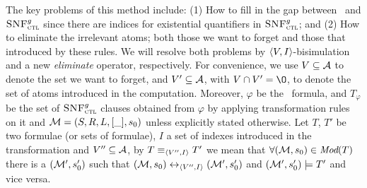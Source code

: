 \documentclass{article}
\begin{document}
The key problems of this method include: (1) How to fill in  the gap between \CTL\ and ${\textsc{SNF}_{\textsc{ctl}}^g}$ since there are indices for existential quantifiers in ${\textsc{SNF}_{\textsc{ctl}}^g}$; and (2) How to eliminate the irrelevant atoms; both those we want to forget and those that introduced by these rules.
We will resolve both problems by ${\langle{V,I}\rangle}$-bisimulation and a new \emph{eliminate} operator, respectively.
For convenience, we use $V\subseteq {\cal A}$ to denote the set we want to forget, and $V' \subseteq {\cal A}$, with $V \cap V'={\O}$,  to denote the set of atoms introduced in the computation.  Moreover, $\varphi$  be the \CTL\ formula, and $T_{\varphi}$ be the set of ${\textsc{SNF}_{\textsc{ctl}}^g}$ clauses obtained from $\varphi$ by applying transformation rules on it  and ${\cal M}=(S,R,L,[\_], s_0)$ unless explicitly stated otherwise.
 Let $T$, $T'$ be two formulae (or sets of formulae), $I$ a set of indexes introduced in the transformation and $V''\subseteq {\cal A}$, by $T\equiv_{{\langle{V'', I}\rangle}} T'$ we mean that $\forall ({\cal M}, s_0) \in \textit{Mod}(T)$ there is a $({\cal M}', s_0')$ such that $({\cal M},s_0) \leftrightarrow_{{\langle{V'', I}\rangle}} ({\cal M}',s_0')$ and $({\cal M}', s_0') \models T'$ and vice versa.

\end{document}
